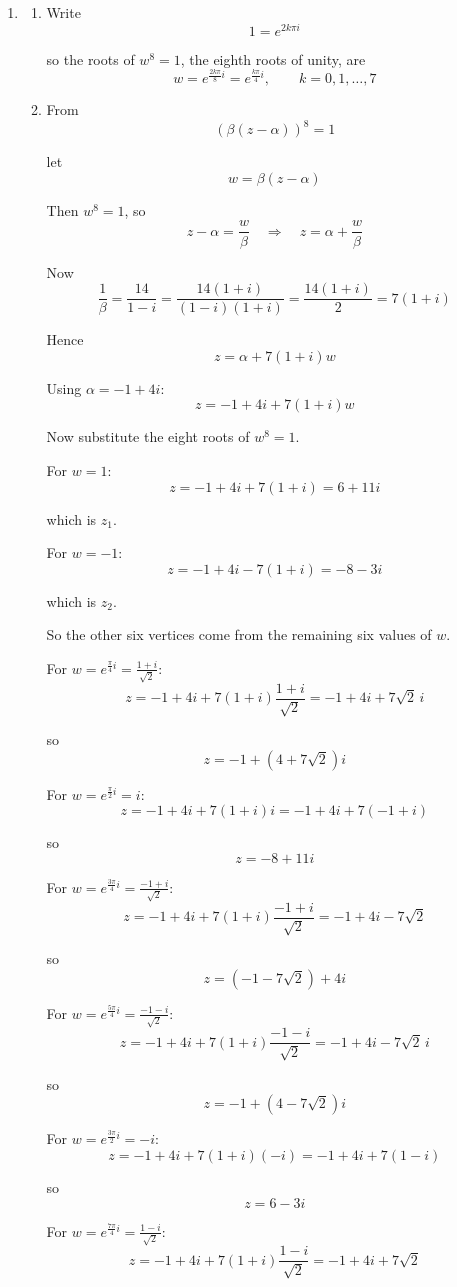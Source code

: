 \documentclass[leqno]{article}
\begin{document}
\begin{enumerate}[
  label=\textbf{\arabic*.},
  leftmargin=*,
  topsep=0pt,
  partopsep=0pt,
  parsep=0pt
]
\begin{djsSolution}
\begin{enumerate}[label=\textbf{(\alph*)}]
  \item 
  \begin{enumerate}[label=(\roman*)]
    \item Write
\[
1=e^{2k\pi i}
\]

so the roots of $w^8=1$, the eighth roots of unity, are
\[
w=e^{\frac{2k\pi}{8}i}=e^{\frac{k\pi}{4}i},\qquad k=0,1,\ldots,7
\]


    \item From
\[
(\beta(z-\alpha))^8=1
\]

let
\[
w=\beta(z-\alpha)
\]

Then $w^8=1$, so
\[
z-\alpha=\frac{w}{\beta}
\quad\Longrightarrow\quad
z=\alpha+\frac{w}{\beta}
\]

Now
\[
\frac{1}{\beta}=\frac{14}{1-i}
=\frac{14(1+i)}{(1-i)(1+i)}
=\frac{14(1+i)}{2}
=7(1+i)
\]

Hence
\[
z=\alpha+7(1+i)w
\]

Using $\alpha=-1+4i$:
\[
z=-1+4i+7(1+i)w
\]

Now substitute the eight roots of $w^8=1$.

For $w=1$:
\[
z=-1+4i+7(1+i)=6+11i
\]

which is $z_1$.

For $w=-1$:
\[
z=-1+4i-7(1+i)=-8-3i
\]

which is $z_2$.

So the other six vertices come from the remaining six values of $w$.

For $w=e^{\frac{\pi}{4}i}=\frac{1+i}{\sqrt2}$:
\[
z=-1+4i+7(1+i)\frac{1+i}{\sqrt2}
=-1+4i+7\sqrt2\,i
\]

so
\[
z=-1+(4+7\sqrt2)i
\]

For $w=e^{\frac{\pi}{2}i}=i$:
\[
z=-1+4i+7(1+i)i
=-1+4i+7(-1+i)
\]

so
\[
z=-8+11i
\]

For $w=e^{\frac{3\pi}{4}i}=\frac{-1+i}{\sqrt2}$:
\[
z=-1+4i+7(1+i)\frac{-1+i}{\sqrt2}
=-1+4i-7\sqrt2
\]

so
\[
z=(-1-7\sqrt2)+4i
\]

For $w=e^{\frac{5\pi}{4}i}=\frac{-1-i}{\sqrt2}$:
\[
z=-1+4i+7(1+i)\frac{-1-i}{\sqrt2}
=-1+4i-7\sqrt2\,i
\]

so
\[
z=-1+(4-7\sqrt2)i
\]

For $w=e^{\frac{3\pi}{2}i}=-i$:
\[
z=-1+4i+7(1+i)(-i)
=-1+4i+7(1-i)
\]

so
\[
z=6-3i
\]

For $w=e^{\frac{7\pi}{4}i}=\frac{1-i}{\sqrt2}$:
\[
z=-1+4i+7(1+i)\frac{1-i}{\sqrt2}
=-1+4i+7\sqrt2
\]


\end{enumerate}
\end{enumerate}
\end{djsSolution}
\end{enumerate}
\end{document}

